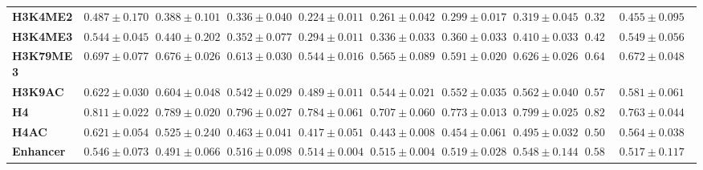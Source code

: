 \begin{table*}
{\begin{tabular}{@{}lcccccccccc@{}}
\textbf{H3K4ME2}          &          $0.487\pm0.170$           &          $0.388\pm0.101$            &         $0.336\pm0.040$               &        $0.224  \pm 0.011$        &      $0.261 \pm  0.042$           &      $0.299 \pm   0.017$           &     $0.319\pm0.045 $            &     $0.326$             &            $0.455 \pm0.095$                        \\
\textbf{H3K4ME3}          &           $0.544\pm0.045$          &       $0.440\pm0.202$               &      $0.352\pm0.077$                  &           $0.294 \pm  0.011$     &      $0.336  \pm 0.033$           &      $ 0.360 \pm  0.033$          &       $0.410\pm0.033 $          &        $0.421$          &           $0.549\pm0.056$                         \\
\textbf{H3K79ME3}         &           $0.697\pm0.077 $          &        $0.676 \pm0.026$              &        $0.613\pm0.030$                &         $0.544 \pm 0.016$       &         $0.565\pm   0.089$        &       $0.591 \pm   0.020$          &      $0.626\pm0.026 $           &       $0.642$           &            $0.672\pm0.048$                        \\
\textbf{H3K9AC}           &         $0.622\pm0.030$            &       $0.604 \pm0.048$               &       $0.542\pm0.029 $                 &         $0.489  \pm 0.011$       &      $0.544 \pm 0.021$           &       $0.552  \pm 0.035$          &      $0.562\pm0.040 $           &       $0.575$           &         $0.581\pm0.061$                           \\
\textbf{H4}               &          $0.811\pm0.022$           &        $0.789\pm0.020$              &      $0.796\pm0.027$                  &       $0.784  \pm 0.061$         &         $0.707 \pm  0.060$        &       $0.773 \pm  0.013$          &    $0.799 \pm0.025 $             &       $0.822$           &           $0.763\pm0.044$                         \\
\textbf{H4AC}             &            $0.621\pm0.054$         &          $0.525\pm0.240$            &          $0.463\pm0.041 $              &      $0.417  \pm 0.051$          &        $0.443 \pm  0.008$         &        $0.454 \pm   0.061$         &      $0.495\pm0.032 $           &        $0.501$          &           $0.564 \pm0.038$                         \\
\textbf{Enhancer}   &            $0.546 \pm0.073$         &          $0.491\pm0.066$            &          $0.516\pm0.098$              &          $0.514  \pm 0.004$      &         $0.515 \pm  0.004$        &             $0.519 \pm   0.028$    &        $0.548\pm0.144 $         &         $0.580$         &          $0.517\pm0.117$                          \\

\end{tabular}}
\end{table*}
